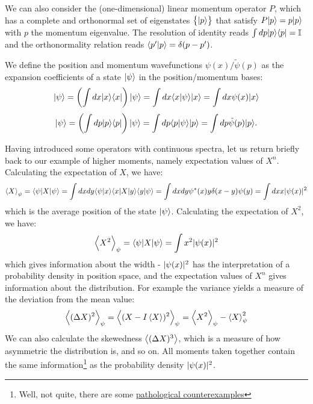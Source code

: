 We can also consider the (one-dimensional) linear momentum operator $P$, which has a complete and orthonormal set of eigenstates $\set{\lvert p \rangle}$ that satisfy $P\lvert p \rangle = p\lvert p \rangle$ with $p$ the momentum eigenvalue. The resolution of identity reads $\int dp \lvert p \rangle \langle p \rvert = \mathbb{I}$ and the orthonormality relation reads $\langle p' \lvert p \rangle = \delta(p - p')$. 

We define the position and momentum wavefunctions $\psi(x)/\tilde{\psi}(p)$ as the expansion coefficients of a state $\lvert \psi \rangle$ in the position/momentum bases:
\begin{equation}
    \lvert \psi \rangle = \left(\int dx \lvert x \rangle \langle x \rvert\right)\lvert \psi \rangle = \int dx \langle x \lvert \psi \rangle \lvert x \rangle = \int dx \psi(x) \lvert x \rangle
\end{equation}
\begin{equation}
    \lvert \psi \rangle = \left(\int dp \lvert p \rangle \langle p \rvert\right) \lvert \psi \rangle = \int dp \langle p \lvert \psi \rangle \lvert p \rangle = \int dp \tilde{\psi}(p) \lvert p \rangle.
\end{equation}

Having introduced some operators with continuous spectra, let us return briefly back to our example of higher moments, namely expectation values of $X^n$. Calculating the expectation of $X$, we have:
\begin{equation}
   \left< X \right>_\psi =  \langle \psi \rvert X\lvert \psi \rangle = \int dx dy \langle \psi \lvert x \rangle \langle x \rvert X\lvert y \rangle \langle y \lvert \psi \rangle = \int dx dy \psi^*(x) y\delta(x - y) \psi(y) = \int dx x\lvert \psi(x) \rvert^2
\end{equation}
which is the average position of the state $\lvert \psi \rangle$. Calculating the expectation of $X^2$, we have:
\begin{equation}
    \left< X^2 \right>_\psi = \langle \psi \rvert X\lvert \psi \rangle = \int x^2 \lvert \psi(x) \rvert^2
\end{equation}
which gives information about the width - $\lvert \psi(x) \rvert^2$ has the interpretation of a probability density in position space, and the expectation values of $X^n$ gives information about the distribution. For example the variance yields a measure of the deviation from the mean value:
\begin{equation}
    \left< (\Delta X)^2 \right>_\psi = \left< (X - I\left< X \right>)^2 \right>_\psi = \left< X^2 \right>_\psi - \left< X \right>^2_\psi
\end{equation} 
We can also calculate the skewedness $\left< (\Delta X)^3 \right>$, which is a measure of how asymmetric the distribution is, and so on. All moments taken together contain the same information\footnote{Well, not quite, there are some \href{https://math.stackexchange.com/questions/1790858/two-random-variables-with-same-moments}{pathological counterexamples}} as the probability density $\lvert \psi(x) \rvert^2$. 

